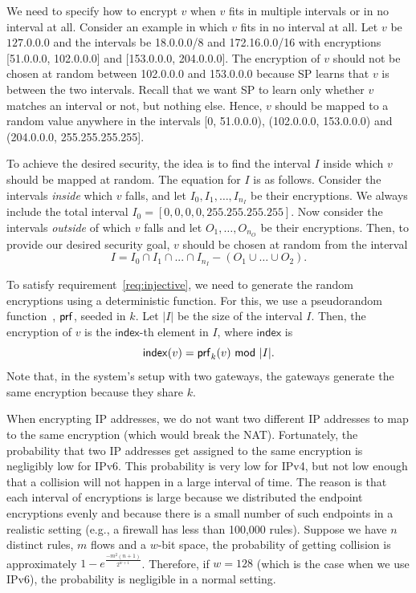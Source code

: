 We need to specify how to encrypt $v$ when $v$ fits in multiple intervals or in no interval at all. Consider an example in which $v$ fits in no interval at all. Let $v$ be $127.0.0.0$ and the intervals be 18.0.0.0/8 and 172.16.0.0/16 with encryptions [51.0.0.0, 102.0.0.0] and [153.0.0.0, 204.0.0.0]. The encryption of $v$ should not be chosen at random between  102.0.0.0 and 153.0.0.0 because SP learns that $v$ is between the two intervals. Recall that we want SP  to learn only whether $v$ matches an interval or not, but nothing else. Hence, $v$ should be mapped to a random value anywhere in the intervals [0, 51.0.0.0), (102.0.0.0, 153.0.0.0) and (204.0.0.0, 255.255.255.255]. 

To achieve the desired security, the idea is to find the interval $I$ inside which $v$ should be mapped at random. The equation for $I$ is as follows. Consider the intervals {\em inside} which $v$ falls, and let $I_0, I_1, \dots, I_{n_I}$ be their encryptions. We always include the total interval $I_0 = [0,0,0,0, 255.255.255.255]$. Now consider the intervals {\em outside} of which $v$ falls and let $O_1, \dots, O_{n_O}$ be their encryptions. Then, to provide our desired security goal, $v$ should be chosen at random from the interval  
\begin{equation}
 I = I_0 \cap I_1 \cap ... \cap I_{n_I} - (O_1 \cup \dots \cup O_2). \label{eq:randominterval}
 \end{equation}

 


To satisfy requirement~\ref{req:injective}, we need to generate the random encryptions using a deterministic function. For this, we use a pseudorandom function~\cite{GoldreichVol1}, $\mathsf{prf}$, seeded in $k$.   Let $|I|$ be the size of the interval $I$. 
Then, the encryption of $v$ is the $\mathsf{index}$-th element in $I$, where $\mathsf{index}$ is 
\[ \mathsf{index}(v) = \prf_k(v)\ \mod\ |I|. \] 
  Note that, in the system's setup with two gateways, the gateways generate the same encryption because they share $k$. 

When encrypting IP addresses, we do not want two different IP addresses to map to the same encryption (which would break the NAT). Fortunately, the probability that two IP addresses get assigned to the same encryption is negligibly low for IPv6. This probability is very low for IPv4, but not low enough that a collision will not happen in a large interval of time. The reason is that each interval of encryptions is large because we distributed the endpoint encryptions evenly and because there is a small number of such endpoints in a realistic setting (e.g., a firewall has less than 100,000 rules). Suppose we have $n$ distinct rules, $m$ flows and a $w$-bit space, the probability of getting collision is approximately $1-e^\frac{-m^2 (n+1)}{2^{w+1}}$. Therefore, if $w=128$ (which is the case when we use IPv6), the probability is negligible in a normal setting. 

